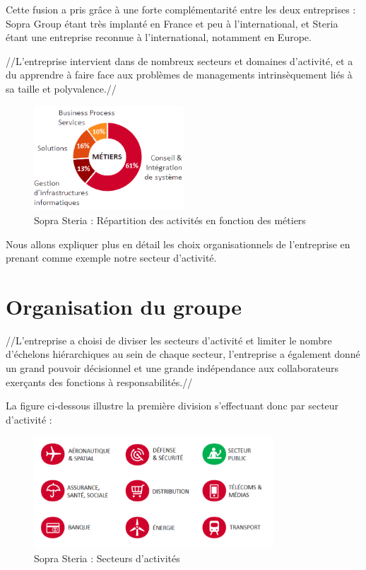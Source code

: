 Cette fusion a pris grâce à une forte complémentarité entre les deux entreprises : Sopra Group étant très implanté en France et peu à l'international, et Steria étant une entreprise reconnue à l'international, notamment en Europe.

//L’entreprise intervient dans de nombreux secteurs et domaines d’activité, et a du apprendre à faire face aux problèmes de managements intrinsèquement liés à sa taille et polyvalence.//

\begin{figure}[!h]
\centering
\includegraphics[width=0.5\textwidth]{images/metier_soprasteria.png}
\caption{Sopra Steria : Répartition des activités en fonction des métiers}
\end{figure}

Nous allons expliquer plus en détail les choix organisationnels de l’entreprise en prenant comme exemple notre secteur d’activité.

\section{Organisation du groupe}

//L'entreprise a choisi de diviser les secteurs d’activité et limiter le nombre d’échelons hiérarchiques au sein de chaque secteur, l’entreprise a également donné un grand pouvoir décisionnel et une grande indépendance aux collaborateurs exerçants des fonctions à responsabilités.//

La figure ci-dessous illustre la première division s’effectuant donc par secteur d’activité :

\begin{figure}[!h]
\centering
\includegraphics[width=0.8\textwidth]{images/secteurActivite.png}
\caption{Sopra Steria : Secteurs d'activités}
\end{figure}


